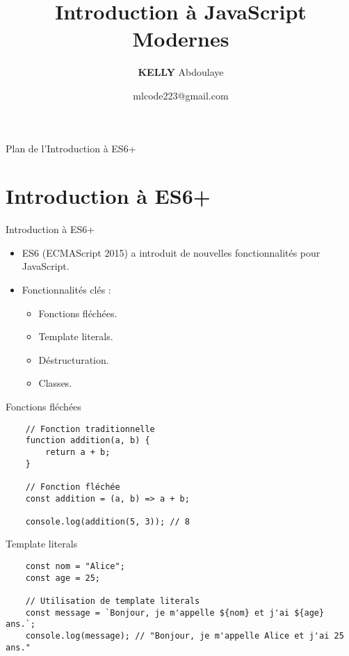 \documentclass{beamer}
\title{Introduction à JavaScript Modernes}
\author{\textbf{KELLY}  Abdoulaye}
\institute{\textit{Mali\_Code}}
\date{mlcode223@gmail.com}
\begin{document}
\begin{frame}
    \titlepage
    \end{frame}
    
    \begin{frame}{Plan de l'Introduction à ES6+}
    \tableofcontents
    \end{frame}
    
    \section{Introduction à ES6+}
    \begin{frame}{Introduction à ES6+}
    \begin{itemize}
        \item ES6 (ECMAScript 2015) a introduit de nouvelles fonctionnalités pour JavaScript.
        \item Fonctionnalités clés :
            \begin{itemize}
                \item Fonctions fléchées.
                \item Template literals.
                \item Déstructuration.
                \item Classes.
            \end{itemize}
    \end{itemize}
    \end{frame}
    
    \begin{frame}[fragile]{Fonctions fléchées}
    \begin{verbatim}
    // Fonction traditionnelle
    function addition(a, b) {
        return a + b;
    }
    
    // Fonction fléchée
    const addition = (a, b) => a + b;
    
    console.log(addition(5, 3)); // 8
    \end{verbatim}
    \end{frame}
    
    \begin{frame}[fragile]{Template literals}
    \begin{verbatim}
    const nom = "Alice";
    const age = 25;
    
    // Utilisation de template literals
    const message = `Bonjour, je m'appelle ${nom} et j'ai ${age} ans.`;
    console.log(message); // "Bonjour, je m'appelle Alice et j'ai 25 ans."
    \end{verbatim}
    \end{frame}
    
\end{document}
